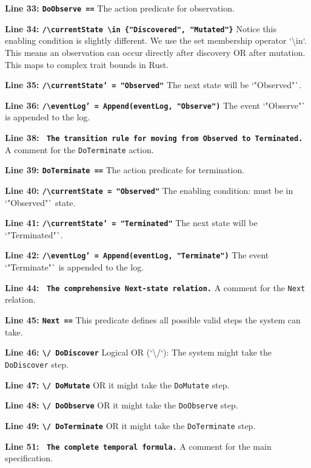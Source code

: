 \textbf{Line 33: \texttt{DoObserve ==}}
The action predicate for observation.

\textbf{Line 34: \texttt{/\textbackslash currentState \textbackslash in \{"Discovered", "Mutated"\}}}
Notice this enabling condition is slightly different. We use the set membership operator `\textbackslash in`. This means an observation can occur directly after discovery OR after mutation. This maps to complex trait bounds in Rust.

\textbf{Line 35: \texttt{/\textbackslash currentState' = "Observed"}}
The next state will be `"Observed"`.

\textbf{Line 36: \texttt{/\textbackslash eventLog' = Append(eventLog, "Observe")}}
The event `"Observe"` is appended to the log.

\textbf{Line 38: \texttt{\* The transition rule for moving from Observed to Terminated.}}
A comment for the \texttt{DoTerminate} action.

\textbf{Line 39: \texttt{DoTerminate ==}}
The action predicate for termination.

\textbf{Line 40: \texttt{/\textbackslash currentState = "Observed"}}
The enabling condition: must be in `"Observed"` state.

\textbf{Line 41: \texttt{/\textbackslash currentState' = "Terminated"}}
The next state will be `"Terminated"`.

\textbf{Line 42: \texttt{/\textbackslash eventLog' = Append(eventLog, "Terminate")}}
The event `"Terminate"` is appended to the log.

\textbf{Line 44: \texttt{\* The comprehensive Next-state relation.}}
A comment for the \texttt{Next} relation.

\textbf{Line 45: \texttt{Next ==}}
This predicate defines all possible valid steps the system can take.

\textbf{Line 46: \texttt{\textbackslash / DoDiscover}}
Logical OR (`\textbackslash /`): The system might take the \texttt{DoDiscover} step.

\textbf{Line 47: \texttt{\textbackslash / DoMutate}}
OR it might take the \texttt{DoMutate} step.

\textbf{Line 48: \texttt{\textbackslash / DoObserve}}
OR it might take the \texttt{DoObserve} step.

\textbf{Line 49: \texttt{\textbackslash / DoTerminate}}
OR it might take the \texttt{DoTerminate} step.

\textbf{Line 51: \texttt{\* The complete temporal formula.}}
A comment for the main specification.

